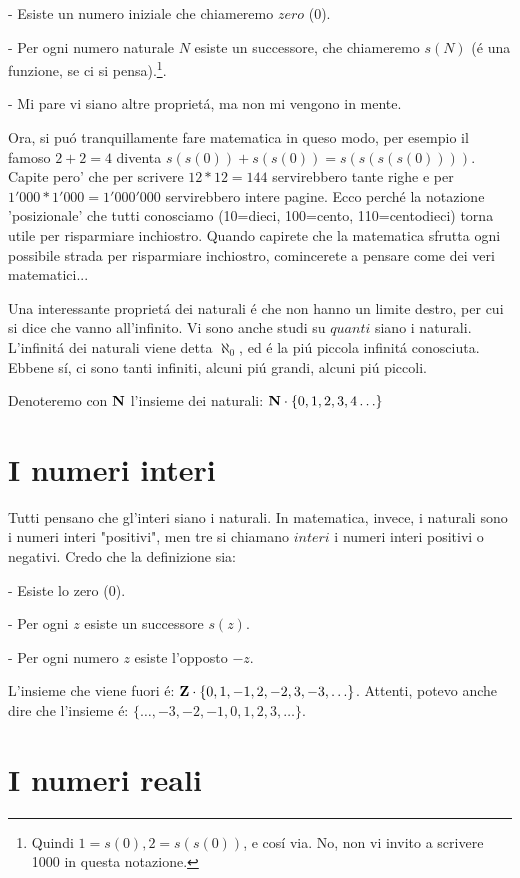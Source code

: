 - Esiste un numero iniziale che chiameremo $zero$ ($0$).

- Per ogni numero naturale $N$ esiste un successore, che chiameremo $s(N)$ (\'e una funzione, se ci si pensa).\footnote{Quindi $1=s(0),2=s(s(0))$, e cos\'i via. 
No, non vi invito a scrivere 1000 in questa notazione.}.

- Mi pare vi siano altre propriet\'a, ma non mi vengono in mente.

Ora, si pu\'o tranquillamente fare matematica in queso modo, per esempio il famoso $2+2=4$ diventa $s(s(0))+s(s(0))=s(s(s(s(0))))$. Capite pero' che per scrivere $12*12=144$ servirebbero tante righe e per $1'000*1'000=1'000'000$ 
servirebbero intere pagine. Ecco perch\'e la notazione 'posizionale' che tutti conosciamo (10=dieci, 100=cento, 110=centodieci) torna utile per risparmiare inchiostro. Quando capirete che la matematica sfrutta ogni possibile strada
per risparmiare inchiostro, comincerete a pensare come dei veri matematici...

Una interessante propriet\'a dei naturali \'e che non hanno un limite destro, per cui si dice che vanno all'infinito. Vi sono anche studi su $quanti$ siano i naturali.
L'infinit\'a dei naturali viene detta $\aleph_0$, ed \'e la pi\'u piccola infinit\'a conosciuta. Ebbene s\'i, ci sono tanti infiniti, alcuni pi\'u grandi, alcuni pi\'u piccoli.

Denoteremo con $\mathbf{N}$ l'insieme dei naturali: $\mathbf{N}\cdot\{0,1,2,3,4\ldots\}$


\section{I numeri interi}

Tutti pensano che gl'interi siano i naturali. In matematica, invece, i naturali sono i numeri interi "positivi", men tre si chiamano $interi$ i numeri interi positivi o negativi.
Credo che la definizione sia:

- Esiste lo zero ($0$).

- Per ogni $z$ esiste un successore $s(z)$.

- Per ogni numero $z$ esiste l'opposto $-z$.

L'insieme che viene fuori \'e: $\mathbf{Z} \cdot \{0,1,-1,2,-2,3,-3,\ldots\}$. Attenti, potevo anche dire che l'insieme \'e: $\{\ldots,-3,-2,-1,0,1,2,3,\ldots\}$.


\section{I numeri reali}

